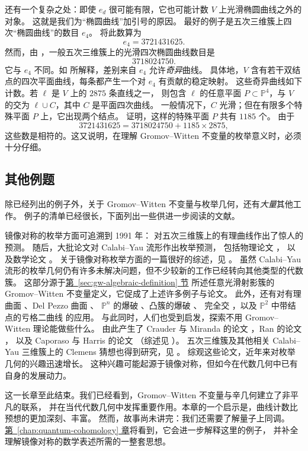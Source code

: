 \begin{example}
还有一个复杂之处：即使 $e_d$ 很可能有限，它也可能计数 $V$ 上光滑椭圆曲线之外的对象。
这就是我们为“椭圆曲线”加引号的原因。
最好的例子是五次三维簇上四次“椭圆曲线”的数目 $e_4$。
 将此数算为
\[
e_4=3721431625.
\]
然而，由 ，一般五次三维簇上的光滑四次椭圆曲线数目是
\[
3718024750.
\]
它与 $e_4$ 不同。如  所解释，差别来自 $e_4$ 允许\emph{奇异}曲线。
具体地，$V$ 含有若干双结点的四次平面曲线，每条都产生一个对 $e_4$ 有贡献的稳定映射。
这些奇异曲线如下计数。若 $\ell$ 是 $V$ 上的 $2875$ 条直线之一，
则包含 $\ell$ 的任意平面 $P\subset\mathbb P^4$，与 $V$ 的交为 $\ell\cup C$，其中 $C$ 是平面四次曲线。
一般情况下，$C$ 光滑；但在有限多个特殊平面 $P$ 上，它出现两个结点。
 证明，这样的特殊平面 $P$ 共有 $1185$ 个。
由于
\[
3721431625=3718024750+1185\times2875,
\]
这些数是相符的。这又说明，在理解 Gromov--Witten 不变量的枚举意义时，必须十分仔细。
\end{example}

\begingroup\linespread{1.22}\selectfont
\subsection{其他例题}\label{subsec:other-gw-examples}
除已经列出的例子外，关于 Gromov--Witten 不变量与枚举几何，还有\emph{大量}其他工作。
例子的清单已经很长，下面列出一些供进一步阅读的文献。

 镜像对称的枚举方面可追溯到 1991 年： 对五次三维簇上的有理曲线作出了惊人的预测。
随后，大批论文对 Calabi--Yau 流形作出枚举预测，
包括物理论文 ，
以及数学论文 。
关于镜像对称枚举方面的一篇很好的综述，见 。
虽然 Calabi--Yau 流形的枚举几何仍有许多未解决问题，但不少较新的工作已经转向其他类型的代数簇。
这部分源于\hyperref[sec:gw-algebraic-definition]{第~\ref*{sec:gw-algebraic-definition} 节}
所述任意光滑射影簇的 Gromov--Witten 不变量定义，它促成了上述许多例子与论文。
此外，还有对有理曲面 、Del Pezzo 曲面 、
$\mathbb P^n$ 的爆破 、凸簇的爆破 、
完全交 ，以及 $\mathbb P^2$ 中带结点的亏格二曲线  的应用。
与此同时，人们也受到启发，探索不用 Gromov--Witten 理论能做些什么。
由此产生了 Crauder 与 Miranda 的论文 ，Ran 的论文 ，
以及 Caporaso 与 Harris 的论文 （综述见 ）。
五次三维簇及其他相关 Calabi--Yau 三维簇上的 Clemens 猜想也得到研究，见 。
综观这些论文，近年来对枚举几何的兴趣迅速增长。
这种兴趣可能起源于镜像对称，但如今在代数几何中已有自身的发展动力。

\enlargethispage{\baselineskip}
 这一长章至此结束。我们已经看到，Gromov--Witten 不变量与辛几何建立了非平凡的联系，
并在当代代数几何中发挥重要作用。本章的一个启示是，曲线计数比预想的更加深刻、丰富。
然而，故事尚未讲完：我们还需要了解量子上同调。
\hyperref[chap:quantum-cohomology]{第~\ref*{chap:quantum-cohomology} 章}将看到，它会进一步解释这里的例子，
并补全理解镜像对称的数学表述所需的一整套思想。
\par\endgroup
